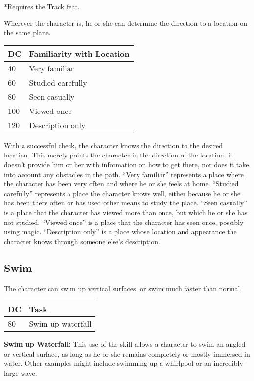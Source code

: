 \documentclass{article}
\begin{document}
*Requires the Track feat. 

\vspace{12pt}
Wherever the character is, he or she can determine the direction to a location 
on the same plane. 

\begin{tabular}{|>{\raggedright}p{13pt}|>{\raggedright}p{111pt}|}
\hline
D\textbf{C} &  \textbf{Familiarity with Location }\tabularnewline
\hline
40  & Very familiar \tabularnewline
\hline
60  & Studied carefully \tabularnewline
\hline
80  & Seen casually \tabularnewline
\hline
100  & Viewed once \tabularnewline
\hline
120  & Description only \tabularnewline
\hline
\end{tabular}

With a successful check, the character knows the direction to the desired location. 
This merely points the character in the direction of the location; it doesn't provide 
him or her with information on how to get there, nor does it take into account 
any obstacles in the path. ``Very familiar'' represents a place where the character 
has been very often and where he or she feels at home. ``Studied carefully'' represents 
a place the character knows well, either because he or she has been there often 
or has used other means to study the place. ``Seen casually'' is a place that the 
character has viewed more than once, but which he or she has not studied. ``Viewed 
once'' is a place that the character has seen once, possibly using magic. ``Description 
only'' is a place whose location and appearance the character knows through someone 
else's description. 

\vspace{12pt}
\subsection*{Swim }

The character can swim up vertical surfaces, or swim much faster than normal. 

\begin{tabular}{|>{\raggedright}p{13pt}|>{\raggedright}p{72pt}|}
\hline
D\textbf{C } & T\textbf{ask }\tabularnewline
\hline
80  & Swim up waterfall \tabularnewline
\hline
\end{tabular}

\textbf{Swim up Waterfall: }This use of the skill allows a character to swim an 
angled or vertical surface, as long as he or she remains completely or mostly immersed 
in water. Other examples might include swimming up a whirlpool or an incredibly 
large wave. 
\end{document}

